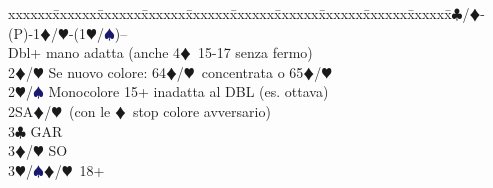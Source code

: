 \documentclass[a4paper,italian]{article}
\newcommand{\BC}{\textcolor{OliveGreen}{$\clubsuit$}}
\newcommand{\BD}{\textcolor{RedOrange}{$\vardiamondsuit$}}
\newcommand{\BH}{\textcolor{Red2}{$\varheartsuit${}}}
\newcommand{\BS}{\textcolor{MidnightBlue}{$\spadesuit${}}}
\newenvironment{bidtable}
{\begin{tabbing}

    xxxxxx\=xxxxxx\=xxxxxx\=xxxxxx\=xxxxxx\=xxxxxx\=xxxxxx\=xxxxxx\=xxxxxx\=xxxxxx\=\kill}
{\end{tabbing} }%
\begin{document}
\begin{multicols}{2}
\begin{tcolorbox}[colframe=azzurro,title={Sviluppi particolari, validi in situazioni analoghe}]
        \bigskip

        \begin{bidtable}
            1\BC/\BD-(P)-1\BD/\BH-(1\BH/\BS)--\\
            Dbl+ mano adatta (anche 4\BD\ 15-17 senza fermo)\\
            2\BD/\BH\> Se nuovo colore: 64\BD/\BH\ concentrata o 65\BD/\BH\\
            2\BH/\BS\> Monocolore 15+ inadatta al DBL (es. ottava)\\
            2SA\BD/\BH\ (con le \BD\ stop colore avversario)\+\\
            3\BC\> GAR\\
            3\BD/\BH\> SO\-\\
            3\BH/\BS{}\BD/\BH\ 18+
        \end{bidtable}

    \end{tcolorbox}
\end{multicols}
\end{document}
